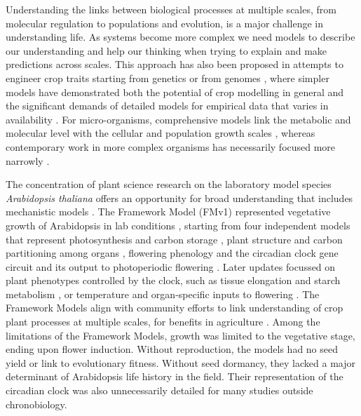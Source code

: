 Understanding the links between biological processes at multiple scales, from
molecular regulation to populations and evolution, is a major challenge in
understanding life. As systems become more complex we need models to describe
our understanding and help our thinking when trying to explain and make
predictions across scales.  This approach has also been proposed in attempts to
engineer crop traits starting from genetics or from genomes
\citep{welch_merging_2005, yin_applying_nodate, yin_modelling_2010,
  parent_can_2014, wu_connecting_2016, chenu_integrating_2018}, where simpler
models have demonstrated both the potential of crop modelling in general and the
significant demands of detailed models for empirical data that varies in
availability \citep{hammer_models_2006,asseng_uncertainty_2013}. For
micro-organisms, comprehensive models link the metabolic and molecular level
with the cellular \citep{karr_whole-cell_2012} and population growth scales
\citep{weise_mechanistic_2015}, whereas contemporary work in more complex
organisms has necessarily focused more narrowly \citep{buckley_modelling_2013,
  lynch_steep_2013, zhu_e-photosynthesis:_2013,klose_systematic_2015,
  le_novere_quantitative_2015, hepworth_absence_2018}.

The concentration of plant science research on the laboratory model species
\emph{Arabidopsis thaliana} offers an opportunity for broad understanding that
includes mechanistic models
\citep{chew_mathematical_2014,voss_modelling_2014}. The Framework Model (FMv1)
represented vegetative growth of Arabidopsis in lab conditions
\citep{chew_multiscale_2014}, starting from four independent models that
represent photosynthesis and carbon storage \citep{rasse_leaf_2006}, plant
structure and carbon partitioning among organs
\citep{christophe_model-based_2008}, flowering phenology
\citep{chew_augmented_2012} and the circadian clock gene circuit and its output
to photoperiodic flowering \citep{salazar_prediction_2009}. Later updates
focussed on plant phenotypes controlled by the clock, such as tissue elongation
and starch metabolism \citep[FMv2;][]{chew_linking_2017}, or temperature and
organ-specific inputs to flowering
\citep{kinmonth-schultz_mechanistic_2018}. The Framework Models align with
community efforts to link understanding of crop plant processes at multiple
scales, for benefits in agriculture \citep{wu_connecting_2016,
  zhu_plants_2016}. Among the limitations of the Framework Models, growth was
limited to the vegetative stage, ending upon flower induction. Without
reproduction, the models had no seed yield or link to evolutionary
fitness. Without seed dormancy, they lacked a major determinant of Arabidopsis
life history in the field. Their representation of the circadian clock was also
unnecessarily detailed for many studies outside chronobiology.

